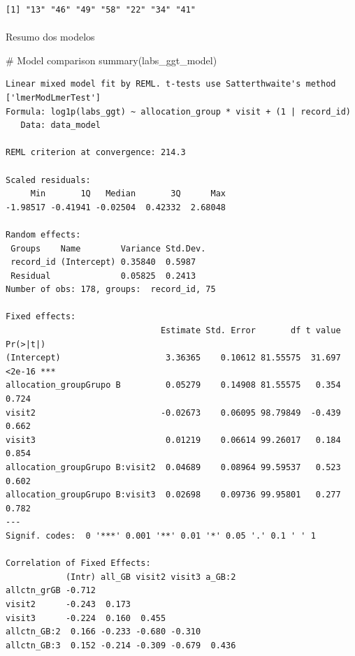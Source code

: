 \documentclass[
  12pt,
]{article}
\makeatletter
\let\oldparagraph\paragraph
\renewcommand{\paragraph}{
    \@ifstar
      \xxxParagraphStar
      \xxxParagraphNoStar
  }
\newcommand{\xxxParagraphStar}[1]{\oldparagraph*{#1}\mbox{}}
\newcommand{\xxxParagraphNoStar}[1]{\oldparagraph{#1}\mbox{}}
\newenvironment{Shaded}{\begin{snugshade}}{\end{snugshade}}
\newcommand{\CommentTok}[1]{\textcolor[rgb]{0.37,0.37,0.37}{#1}}
\newcommand{\FunctionTok}[1]{\textcolor[rgb]{0.28,0.35,0.67}{#1}}
\newcommand{\NormalTok}[1]{\textcolor[rgb]{0.00,0.23,0.31}{#1}}
\makeatother
\begin{document}
\begin{verbatim}
[1] "13" "46" "49" "58" "22" "34" "41"
\end{verbatim}

\paragraph{Resumo dos modelos}\label{resumo-dos-modelos-2}

\begin{Shaded}
\begin{Highlighting}[]
\CommentTok{\# Model comparison}
\FunctionTok{summary}\NormalTok{(labs\_ggt\_model)}
\end{Highlighting}
\end{Shaded}

\begin{verbatim}
Linear mixed model fit by REML. t-tests use Satterthwaite's method ['lmerModLmerTest']
Formula: log1p(labs_ggt) ~ allocation_group * visit + (1 | record_id)
   Data: data_model

REML criterion at convergence: 214.3

Scaled residuals: 
     Min       1Q   Median       3Q      Max 
-1.98517 -0.41941 -0.02504  0.42332  2.68048 

Random effects:
 Groups    Name        Variance Std.Dev.
 record_id (Intercept) 0.35840  0.5987  
 Residual              0.05825  0.2413  
Number of obs: 178, groups:  record_id, 75

Fixed effects:
                               Estimate Std. Error       df t value Pr(>|t|)    
(Intercept)                     3.36365    0.10612 81.55575  31.697   <2e-16 ***
allocation_groupGrupo B         0.05279    0.14908 81.55575   0.354    0.724    
visit2                         -0.02673    0.06095 98.79849  -0.439    0.662    
visit3                          0.01219    0.06614 99.26017   0.184    0.854    
allocation_groupGrupo B:visit2  0.04689    0.08964 99.59537   0.523    0.602    
allocation_groupGrupo B:visit3  0.02698    0.09736 99.95801   0.277    0.782    
---
Signif. codes:  0 '***' 0.001 '**' 0.01 '*' 0.05 '.' 0.1 ' ' 1

Correlation of Fixed Effects:
            (Intr) all_GB visit2 visit3 a_GB:2
allctn_grGB -0.712                            
visit2      -0.243  0.173                     
visit3      -0.224  0.160  0.455              
allctn_GB:2  0.166 -0.233 -0.680 -0.310       
allctn_GB:3  0.152 -0.214 -0.309 -0.679  0.436
\end{verbatim}
\end{document}
